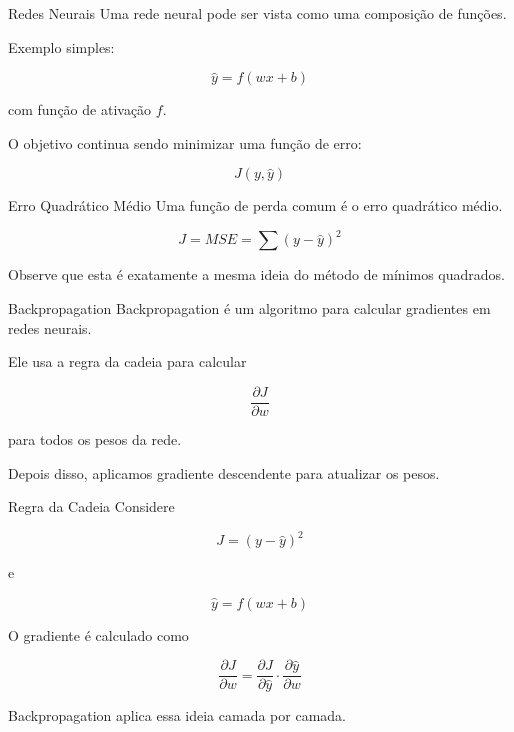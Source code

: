 \documentclass{beamer}
\begin{document}

\begin{frame}{Redes Neurais}
    Uma rede neural pode ser vista como uma composição de funções.
    
    Exemplo simples:
    
    \[
    \hat{y} = f(wx + b)
    \]
    
    com função de ativação $f$.
    
    O objetivo continua sendo minimizar uma função de erro:
    
    \[
    J(y,\hat{y})
    \]
\end{frame}


\begin{frame}{Erro Quadrático Médio}
    Uma função de perda comum é o erro quadrático médio.
    
    \[
    J = MSE = 
    \sum (y - \hat{y})^2
    \]
    
    Observe que esta é exatamente a mesma ideia
    do método de mínimos quadrados.
\end{frame}


\begin{frame}{Backpropagation}
    Backpropagation é um algoritmo para calcular gradientes em redes neurais.
    
    Ele usa a regra da cadeia para calcular
    
    \[
    \frac{\partial J}{\partial w}
    \]
    
    para todos os pesos da rede.
    
    Depois disso, aplicamos gradiente descendente para atualizar os pesos.
\end{frame}


\begin{frame}{Regra da Cadeia}
    Considere
    
    \[
    J = (y - \hat{y})^2
    \]
    
    e
    
    \[
    \hat{y} = f(wx+b)
    \]
    
    O gradiente é calculado como
    
    \[
    \frac{\partial J}{\partial w}
    =
    \frac{\partial J}{\partial \hat{y}}
    \cdot
    \frac{\partial \hat{y}}{\partial w}
    \]
    
    Backpropagation aplica essa ideia camada por camada.
\end{frame}
\end{document}
